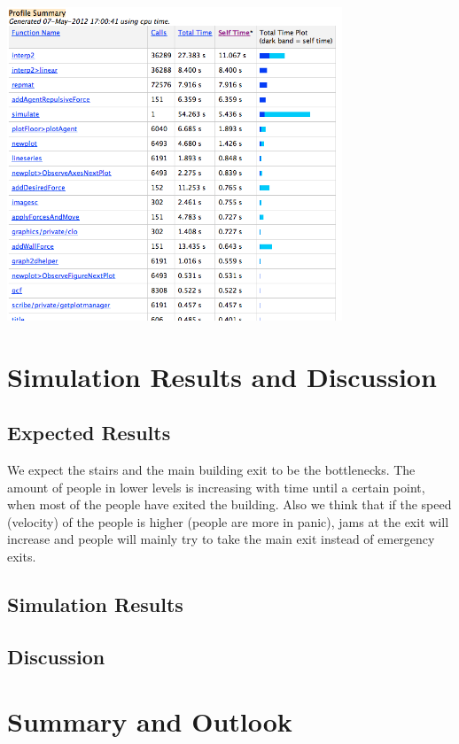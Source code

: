 \documentclass[11pt]{article}
\begin{document}
\begin{center}
	\includegraphics[width=100mm]{./images/profiler.png}
\end{center}

\section{Simulation Results and Discussion}

\subsection{Expected Results}

We expect the stairs and the main building exit to be the bottlenecks. The amount of people in lower levels is increasing with time until a certain point, when most of the people have exited the building. Also we think that if the speed (velocity) of the people is higher (people are more in panic), jams at the exit will increase and people will mainly try to take the main exit instead of emergency exits.

\subsection{Simulation Results}


\subsection{Discussion}


\section{Summary and Outlook}
\end{document}
